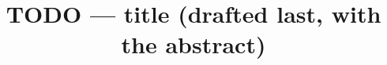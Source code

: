 \documentclass[conference]{IEEEtran}
\begin{document}
\title{TODO --- title (drafted last, with the abstract)}
\author{}
\maketitle

\begin{abstract}
\end{abstract}

% 
% 
% 
% 
% 
% 
% 



\end{document}
